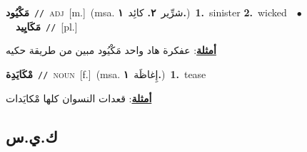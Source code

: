 \documentclass[10pt,a4paper,twoside]{article} %
\begin{document}
\begin{multicols}{2}
{\setlength\topsep{0pt}\textbf{\foreignlanguage{arabic}{مَكْيُود}}\ {\color{gray}\texttt{//}\color{black}}\ \textsc{adj}\ [m.]\ \color{gray}(msa. \foreignlanguage{arabic}{شرِّير}~\foreignlanguage{arabic}{\textbf{٢.}}  \foreignlanguage{arabic}{كائِد}~\foreignlanguage{arabic}{\textbf{١.}})\color{black}\ \textbf{1.}~sinister  \textbf{2.}~wicked\ \ $\bullet$\ \ \setlength\topsep{0pt}\textbf{\foreignlanguage{arabic}{مَكَايِيد}}\ {\color{gray}\texttt{//}\color{black}}\ [pl.]\  \begin{flushright}\color{gray}\foreignlanguage{arabic}{\textbf{\underline{\foreignlanguage{arabic}{أمثلة}}}: عفكرة هاد واحد مَكْيُود مبين من طريقة حكيه}\end{flushright}\color{black}} \vspace{2mm}

{\setlength\topsep{0pt}\textbf{\foreignlanguage{arabic}{مْكَايَدِة}}\ {\color{gray}\texttt{//}\color{black}}\ \textsc{noun}\ [f.]\ \color{gray}(msa. \foreignlanguage{arabic}{إِغاظَة}~\foreignlanguage{arabic}{\textbf{١.}})\color{black}\ \textbf{1.}~tease\  \begin{flushright}\color{gray}\foreignlanguage{arabic}{\textbf{\underline{\foreignlanguage{arabic}{أمثلة}}}: قعدات النسوان كلها مْكايَدات}\end{flushright}\color{black}} \vspace{2mm}

\vspace{-3mm}
\subsection*{\color{blue}\foreignlanguage{arabic}{ك.ي.س}\color{blue}{}} 


\end{multicols}
\end{document}
